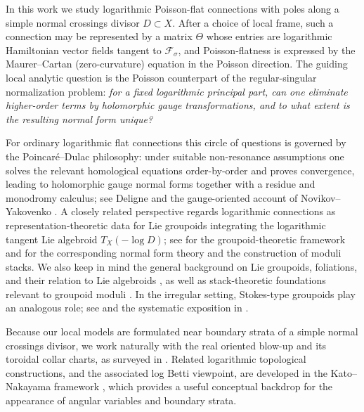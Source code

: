 \documentclass[11pt]{amsart}
\theoremstyle{plain}
\theoremstyle{definition}
\newcommand{\fol}{\mathcal{F}}
\theoremstyle{definition}
\begin{document}
In this work we study logarithmic Poisson-flat connections with poles along a simple normal
crossings divisor $D\subset X$. After a choice of local frame, such a connection may be represented
by a matrix $\Theta$ whose entries are logarithmic Hamiltonian vector fields tangent to $\fol_\sigma$,
and Poisson-flatness is expressed by the Maurer--Cartan (zero-curvature) equation in the Poisson
direction. The guiding local analytic question is the Poisson counterpart of the regular-singular
normalization problem: \textit{for a fixed logarithmic principal part, can one eliminate higher-order terms
by holomorphic gauge transformations, and to what extent is the resulting normal form unique?
}

For ordinary logarithmic flat connections this circle of questions is governed by the
Poincar\'e--Dulac philosophy: under suitable non-resonance assumptions one solves the
relevant homological equations order-by-order and proves convergence, leading to holomorphic gauge
normal forms together with a residue and monodromy calculus; see Deligne \cite{Deligne70} and the
gauge-oriented account of Novikov--Yakovenko \cite{NY02}. A closely related perspective regards logarithmic connections as representation-theoretic data for Lie groupoids integrating the logarithmic tangent Lie algebroid $T_X(-\log D)$; see \cite{Bischoff20} for the groupoid-theoretic framework and \cite{Bischoff22} for the corresponding normal form theory and the construction of moduli stacks. We also keep in mind the general background on Lie groupoids,
foliations, and their relation to Lie algebroids \cite{MM03}, as well as stack-theoretic foundations
relevant to groupoid moduli \cite{Noohi}. In the irregular setting, Stokes-type groupoids play an
analogous role; see \cite{GLP18} and the systematic exposition in \cite{Sabbah13}.

Because our local models are formulated near boundary strata of a simple normal crossings divisor,
we work naturally with the real oriented blow-up and its toroidal collar charts, as surveyed in
\cite{PopescuPampu25}. Related logarithmic topological constructions, and the associated log Betti
viewpoint, are developed in the Kato--Nakayama framework \cite{KN99}, which provides a useful
conceptual backdrop for the appearance of angular variables and boundary strata.
\end{document}
